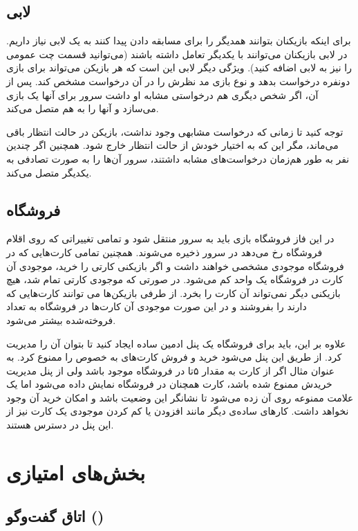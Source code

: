 \documentclass[]{article}
\begin{document}
\subsection*{{\titr لابی}}
برای اینکه بازیکنان بتوانند همدیگر را برای مسابقه دادن پیدا کنند به یک لابی نیاز داریم. در لابی بازیکنان می‌توانند با یکدیگر تعامل داشته باشند (می‌توانید قسمت چت عمومی را نیز به لابی اضافه کنید). ویژگی دیگر لابی این است که هر بازیکن می‌تواند برای بازی دونفره درخواست بدهد و نوع بازی مد نظرش را در آن درخواست مشخص کند. پس از آن، اگر شخص دیگری هم درخواستی مشابه او داشت سرور برای آنها یک بازی می‌سازد و آنها را به هم متصل می‌کند. 

توجه کنید تا زمانی که درخواست مشابهی وجود نداشت، بازیکن در حالت انتظار باقی می‌ماند، مگر این که به اختیار خودش از حالت انتظار خارج شود. همچنین اگر چندین نفر به طور هم‌زمان درخواست‌های مشابه داشتند، سرور آن‌ها را به صورت تصادفی به یکدیگر متصل می‌کند.

\subsection*{{\titr فروشگاه}}
در این فاز فروشگاه بازی باید به سرور منتقل شود و تمامی تغییراتی که روی اقلام فروشگاه رخ می‌دهد در سرور ذخیره می‌شوند. همچنین تمامی کارت‌هایی که در فروشگاه موجودی مشخصی خواهند داشت و اگر بازیکنی کارتی را خرید، موجودی آن کارت در فروشگاه یک واحد کم می‌شود. در صورتی که موجودی کارتی تمام شد، هیچ بازیکنی دیگر نمی‌تواند آن کارت را بخرد. از طرفی بازیکن‌ها می توانند کارت‌هایی که دارند را بفروشند و در این صورت موجودی آن کارت‌ها در فروشگاه به تعداد فروخته‌شده بیشتر می‌شود.

علاوه بر این، باید برای فروشگاه یک پنل ادمین ساده ایجاد کنید تا بتوان آن را مدیریت کرد. از طریق این پنل می‌شود خرید و فروش کارت‌های به خصوص را ممنوع کرد. به عنوان مثال اگر از کارت  به مقدار ۵تا در فروشگاه موجود باشد ولی از پنل مدیریت خریدش ممنوع شده باشد، کارت همچنان در فروشگاه نمایش داده می‌شود اما یک علامت ممنوعه روی آن زده می‌شود تا نشانگر این وضعیت باشد و امکان خرید آن وجود نخواهد داشت. کارهای ساده‌ی دیگر مانند افزودن یا کم کردن موجودی یک کارت نیز از این پنل در دسترس هستند.


\section*{{\titr بخش‌های امتیازی}}

\subsection*{{\titr اتاق گفت‌وگو ()}}
\end{document}
